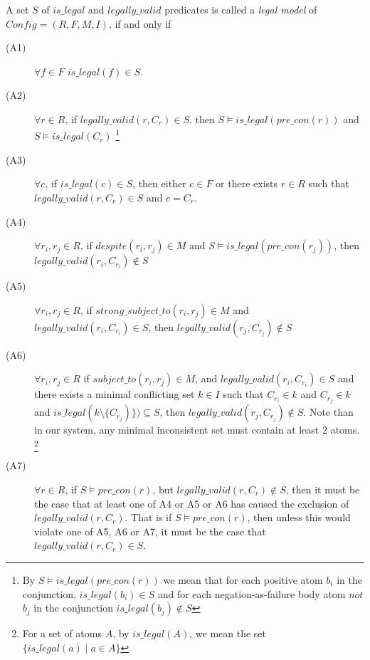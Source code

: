 A set $S$ of $is\_legal$ and $legally\_valid$ predicates is called a \textit{legal model} of $Config = (R,F,M,I)$, if and only if
\begin{description}
\item[(A1)]$\forall f \in F$ $is\_legal(f) \in S$.

\item[(A2)] $\forall r \in R$, if $legally\_valid(r,C_{r}) \in S$. then $S\models is\_legal(pre\_con(r))$ and $S\models is\_legal(C_{r})$ \footnote{By $S\models is\_legal(pre\_con(r))$ we mean that for each positive atom $b_{i}$ in the conjunction, $is\_legal(b_{i}) \in S$ and for each negation-as-failure body atom $not$ $b_{j}$ in the conjunction $is\_legal(b_{j})\notin S$ }

\item[(A3)] $\forall c$, if $is\_legal(c) \in S$, then either $c\in F$ or there exists $r \in R$ such that $legally\_valid(r,C_{r}) \in S$ and $c= C_{r}$.

\item[(A4)] $\forall r_{i}, r_{j} \in R$, if $despite(r_{i}, r_{j}) \in M$ and $S\models is\_legal(pre\_con(r_{j}))$, then $legally\_valid(r_{i},C_{r_{i}}) \notin S$

\item[(A5)] $\forall r_{i}, r_{j} \in R$, if $strong\_subject\_to(r_{i}, r_{j}) \in M$ and $legally\_valid(r_{i},C_{r_{i}}) \in S$, then $legally\_valid(r_{j},C_{r_{j}}) \notin S$


\item[(A6)] $\forall r_{i},r_{j} \in R$ if $subject\_to(r_{i},r_{j}) \in M$, and $legally\_valid(r_{i},C_{r_{i}}) \in S$ and there exists a minimal conflicting set $k \in I$ such that $C_{r_{i}} \in k$ and $C_{r_{j}}\in k$ and $is\_legal(k\setminus \{C_{r_{j}})\})\subseteq S $, then $legally\_valid(r_{j},C_{r_{j}}) \notin S$. Note than in our system, any minimal inconsistent set must contain at least 2 atoms. \footnote{For a set of atoms $A$, by $is\_legal(A)$, we mean the set $\{is\_legal(a)\mid a\in A\}$} 

\item[(A7)] $\forall r\in R$, if $S\models pre\_con(r)$, but $legally\_valid(r,C_{r})\notin S$, then it must be the case that at least one of A4 or A5 or A6 has caused the exclusion of $legally\_valid(r,C_{r})$. That is if $S\models pre\_con(r)$, then unless this would violate one of A5, A6 or A7, it must be the case that $legally\_valid(r,C_{r})\in S$.
\end{description}

